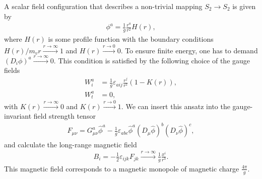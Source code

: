 \documentclass[aps, prd, twocolumn, superscriptaddress, preprintnumbers, nofootinbib, longbibliography]{revtex4-1}
\begin{document}
A scalar field configuration that describes a non-trivial mapping $S_2 \rightarrow S_2$ is given by
\begin{align}
\label{eq:scalar-field-monopole}
    \phi^a=\frac{1}{g}\frac{r^a}{r^2}H(r),
\end{align}
where $H(r)$ is some profile function with the boundary conditions $H(r)/m_v r \xrightarrow{r \rightarrow \infty} 1$ and $H(r)\xrightarrow{r \rightarrow 0}0$.
To ensure finite energy, one has to demand $(D_i \phi)^a\xrightarrow{r\rightarrow\infty}0$. This condition is satisfied by the following choice of the gauge fields
\begin{align}
\label{eq:gauge-field-monopole}
     W^a_i&=\frac{1}{g}\varepsilon_{aij}\frac{r^j}{r^2}(1-K(r)),\nonumber\\
    W^a_t&=0,
\end{align}
with $K(r)\xrightarrow{r \rightarrow \infty}0$ and $K(r)\xrightarrow{r \rightarrow 0}1$.
We can insert this ansatz into the gauge-invariant field strength tensor~\cite{tHooft:1974kcl}
\begin{align}
    F_{\mu\nu}=G_{\mu\nu}^a \hat{\phi}^a-\frac{1}{g}\varepsilon_{abc}\hat{\phi}^a (D_\mu \hat{\phi})^b (D_\nu \hat{\phi})^c,
\end{align}
and calculate the long-range magnetic field
\begin{align}
    B_i=-\frac{1}{2}\varepsilon_{ijk} F_{jk}\xrightarrow{r\rightarrow \infty}\frac{1}{g}\frac{x^i}{r^3}.
\end{align}
This magnetic field corresponds to a magnetic monopole of magnetic charge $\frac{4 \pi}{g}$. \\
\end{document}
